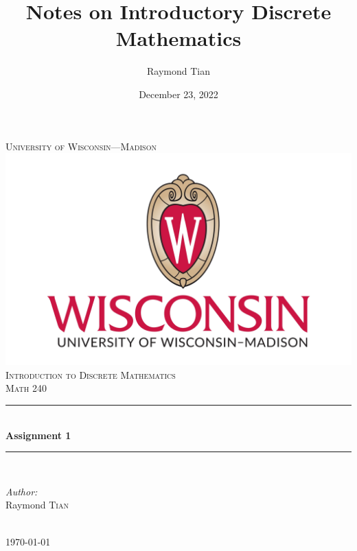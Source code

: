 \documentclass{report}
\title{Notes on Introductory Discrete Mathematics}
\author{Raymond Tian}
\date{December 23, 2022}
\theoremstyle{mytheoremstyle}
\theoremstyle{mytheoremstyle}
\theoremstyle{myproblemstyle}
\begin{document}
\begin{titlepage}
\newcommand{\HRule}{\rule{\linewidth}{0.5mm}}  
\begin{center}
\textsc{\LARGE University of Wisconsin---Madison}\\[1.5cm] 
\includegraphics[scale=.1]{../../images/uw-logo.png}\\[1cm] 
\textsc{\Large Introduction to Discrete Mathematics}\\[0.5cm] 
\textsc{\large Math 240}\\[0.5cm] 

\HRule \\[0.4cm]
{ \huge \bfseries Assignment 1}\\[0.4cm] 
\HRule \\[1.5cm]

\begin{minipage}{0.4\textwidth}
\begin{flushleft} \large
\emph{Author:}\\
Raymond \textsc{Tian}\\ 
\end{flushleft}

\end{minipage}\\[2cm]

{\large \today}\\[2cm] 

\vfill 

\end{center}
\end{titlepage}

\pagestyle{empty}
\newpage
\pagestyle{fancy}
\end{document}
